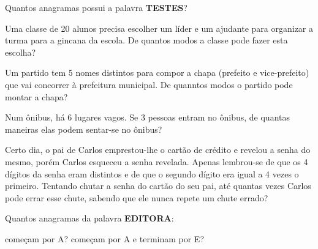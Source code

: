 \documentclass[a4paper,11pt,addpoints]{exam}
\begin{document}
\begin{questions}

	\question[1]

	Quantos anagramas possui a palavra \textbf{TESTES}?

	\question[1]

	Uma classe de 20 alunos precisa escolher um líder e um ajudante para
	organizar a turma para a gincana da escola. De quantos modos a classe
	pode fazer esta escolha?

	\question[1]

	Um partido tem 5 nomes distintos para compor a chapa (prefeito e vice-prefeito)
	que vai concorrer à prefeitura municipal. De quanntos modos o partido pode
	montar a chapa?

	\question[1]

	Num ônibus, há 6 lugares vagos. Se 3 pessoas entram no ônibus, de quantas
	maneiras elas podem sentar-se no ônibus?

	\question[1]

	Certo dia, o pai de Carlos emprestou-lhe o cartão de crédito e revelou a
	senha do mesmo, porém Carlos esqueceu a senha revelada. Apenas lembrou-se
	de que os 4 dígitos da senha eram distintos e de que o segundo dígito era
	igual a 4 vezes o primeiro. Tentando chutar a senha do cartão do seu pai,
	até quantas vezes Carlos pode errar esse chute, sabendo que ele nunca
	repete um chute errado?

	\question[1]

	Quantos anagramas da palavra \textbf{EDITORA}:

	\begin{tasks}
		\task começam por A?
		\task começam por A e terminam por E?
	\end{tasks}







\end{questions}
\end{document}
